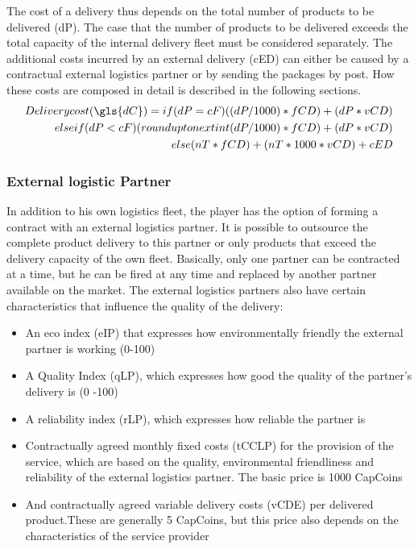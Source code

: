 The cost of a delivery thus depends on the total number of products to be delivered (\gls{dP}). 
The case that the number of products to be delivered exceeds the total capacity of the internal delivery fleet must be considered separately. The additional costs incurred by an external delivery (\gls{cED}) can either be caused by a contractual external logistics partner or by sending the packages by post. How these costs are composed in detail is described in the following sections. 
\begin{equation}
\label{func:deliveryCost}
\begin{aligned}
Delivery cost (\gls{dC}) = if ( dP = cF ) { (( dP / 1000) * fCD) + ( dP * vCD) } \\
elseif ( dP < cF ) { (round up to next int ( dP / 1000) * fCD ) + ( dP * vCD) } \\
else { ( nT * fCD ) + ( nT *1000 * vCD ) + cED }
\end{aligned}
\end{equation}

\subsubsection{External logistic Partner}
In addition to his own logistics fleet, the player has the option of forming a contract with an external logistics partner. It is possible to outsource the complete product delivery to this partner or only products that exceed the delivery capacity of the own fleet. Basically, only one partner can be contracted at a time, but he can be fired at any time and replaced by another partner available on the market. 
The external logistics partners also have certain characteristics that influence the quality of the delivery: 

\begin{itemize}
    \item An eco index (\gls{eIP}) that expresses how environmentally friendly the external partner is working (0-100)
    \item A Quality Index (\gls{qLP}), which expresses how good the quality of the partner's delivery is (0 -100)
    \item A reliability index (\gls{rLP}), which expresses how reliable the partner is
    \item Contractually agreed monthly fixed costs (\gls{tCCLP}) for the provision of the service, which are based on the quality, environmental friendliness and reliability of the external logistics partner. The basic price is 1000 CapCoins 
    \item And contractually agreed variable delivery costs (\gls{vCDE}) per delivered product.These are generally 5 CapCoins, but this price also depends on the characteristics of the service provider
\end{itemize}

